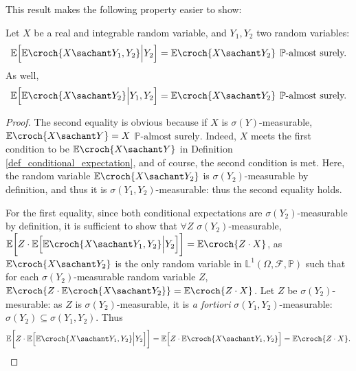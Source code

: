 This result makes the following property easier to show:
\begin{Property} \label{res_espcond} Let $X$ be a real and integrable random variable, 
and $Y_1,Y_2$ two random variables:
\begin{equation*}
\displaystyle \mathbb{E} \Big[  \mathbb{E} \croch{ X \sachant Y_1,Y_2  } \Big\vert Y_2  \Big] = \mathbb{E} \croch{ X \sachant Y_2  } \hspace{0.15cm} \mathbb{P}\mbox{-almost surely.} 
\end{equation*}
As well,
\[ \displaystyle \mathbb{E} \Big[  \mathbb{E} \croch{ X \sachant Y_2  } \Big\vert Y_1, Y_2  \Big] = \mathbb{E} \croch{ X \sachant Y_2  } \hspace{0.15cm} \mathbb{P}\mbox{-almost surely.} \]
\end{Property}
\begin{proof}
The second equality is obvious because
if $X$ is $\sigma(Y)$-measurable, $\mathbb{E} \croch{ X \sachant Y } = X$ 
$\mathbb{P}\mbox{-almost surely.}$ Indeed, $X$ meets the first condition 
to be $\displaystyle \mathbb{E} \croch{ X \sachant Y }$ in Definition \ref{def_conditional_expectation}, and of course, the second condition is met.
Here, the random variable $\mathbb{E} \croch{ X \sachant Y_2 }$ 
is $\sigma(Y_2)$-measurable by definition,
and thus it is $\sigma(Y_1,Y_2)$-measurable: 
thus the second equality holds.

For the first equality, 
since both conditional expectations are $\sigma(Y_2)$-measurable by definition, 
it is sufficient to show that $\forall Z$ $\sigma(Y_2)$-measurable, 
$\mathbb{E} \bigg[ Z \cdot \mathbb{E} \Big[ \mathbb{E} \croch{ X  \sachant Y_1 , Y_2 }  \Big\vert Y_2  \Big]   \bigg] 
= \mathbb{E} \croch{ Z \cdot X  }$,
as $\mathbb{E} \croch{ X \sachant Y_2 }$ is the only random variable in $\mathbb{L}^1(\Omega,\mathcal{F},\mathbb{P})$ 
such that for each $\sigma(Y_2)$-measurable random variable $Z$,
$\mathbb{E} \croch{ Z \cdot \mathbb{E} \croch{ X \sachant Y_2 } } = \mathbb{E} \croch{ Z \cdot X}$.
Let $Z$ be $\sigma(Y_2)$-mesurable:
as $Z$ is $\sigma(Y_2)$-measurable, 
it is \textit{a fortiori} $\sigma(Y_1,Y_2)$-measurable: 
$\sigma(Y_2) \subseteq \sigma(Y_1,Y_2)$.
Thus 
\[ \mathbb{E} \bigg[ Z \cdot \mathbb{E} \Big[ \mathbb{E} \croch{ X \sachant Y_1 , Y_2 } \Big\vert Y_2  \Big] \bigg] 
= \mathbb{E} \Big[ Z \cdot \mathbb{E} \croch{ X  \sachant Y_1 , Y_2 } \Big]
= \mathbb{E} \croch{ Z \cdot X }. \] 
\end{proof}




